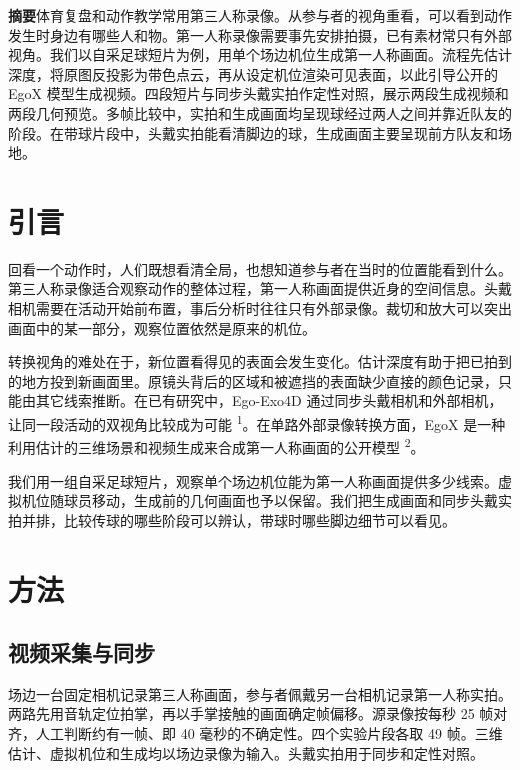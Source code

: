 \documentclass[UTF8,a4paper,11pt,fontset=fandol]{ctexart}
\newcommand{\refs}[1]{\unskip\nobreak\hspace{.14em}\textsuperscript{\color{accent}#1}}
\begin{document}
\medskip
{}
\bigskip
\noindent\textbf{摘要}\quad 体育复盘和动作教学常用第三人称录像。从参与者的视角重看，可以看到动作发生时身边有哪些人和物。第一人称录像需要事先安排拍摄，已有素材常只有外部视角。我们以自采足球短片为例，用单个场边机位生成第一人称画面。流程先估计深度，将原图反投影为带色点云，再从设定机位渲染可见表面，以此引导公开的 EgoX 模型生成视频。四段短片与同步头戴实拍作定性对照，展示两段生成视频和两段几何预览。多帧比较中，实拍和生成画面均呈现球经过两人之间并靠近队友的阶段。在带球片段中，头戴实拍能看清脚边的球，生成画面主要呈现前方队友和场地。

\section*{引言}
回看一个动作时，人们既想看清全局，也想知道参与者在当时的位置能看到什么。第三人称录像适合观察动作的整体过程，第一人称画面提供近身的空间信息。头戴相机需要在活动开始前布置，事后分析时往往只有外部录像。裁切和放大可以突出画面中的某一部分，观察位置依然是原来的机位。

转换视角的难处在于，新位置看得见的表面会发生变化。估计深度有助于把已拍到的地方投到新画面里。原镜头背后的区域和被遮挡的表面缺少直接的颜色记录，只能由其它线索推断。在已有研究中，Ego-Exo4D 通过同步头戴相机和外部相机，让同一段活动的双视角比较成为可能 \refs{1}。在单路外部录像转换方面，EgoX 是一种利用估计的三维场景和视频生成来合成第一人称画面的公开模型 \refs{2}。

我们用一组自采足球短片，观察单个场边机位能为第一人称画面提供多少线索。虚拟机位随球员移动，生成前的几何画面也予以保留。我们把生成画面和同步头戴实拍并排，比较传球的哪些阶段可以辨认，带球时哪些脚边细节可以看见。

\section*{方法}
\subsection*{视频采集与同步}
场边一台固定相机记录第三人称画面，参与者佩戴另一台相机记录第一人称实拍。两路先用音轨定位拍掌，再以手掌接触的画面确定帧偏移。源录像按每秒 25 帧对齐，人工判断约有一帧、即 40 毫秒的不确定性。四个实验片段各取 49 帧。三维估计、虚拟机位和生成均以场边录像为输入。头戴实拍用于同步和定性对照。
\end{document}

